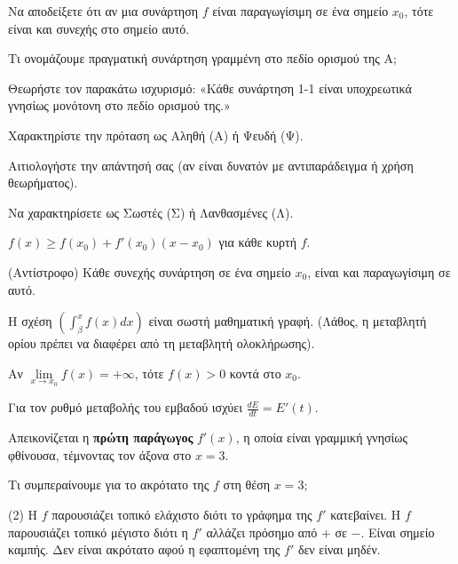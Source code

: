 \documentclass[11pt,a4paper]{article}
\newcommand{\kerkissans}[1]{{\fontfamily{maksf}\selectfont \textbf{#1}}}
\renewcommand{\textdexiakeraia}{}
\newcommand{\dint}{\displaystyle\int}
\newcommand\themanum{A}
\newcounter{thema}[section]
\renewcommand{\thethema}{\arabic{thema}}
\newcommand{\Thema}{\refstepcounter{thema}{\textbf{\textcolor{black}{\faPenSquare\ \  \large \kerkissans{\textbf{\thethemaο\hspace{2mm}Διαγώνισμα - Θέμα \themanum}}}}}\hspace{0mm}}{}
\newenvironment{thema}[1]
{\begin{tcolorbox}[title=\Thema\kerkissans{\textbf{\large{  #1}}},breakable,
enhanced standard,titlerule=0pt,toprule=0pt, rightrule=0pt, bottomrule=0pt,
colback=white,left=0mm,top=1mm,bottom=0mm,
boxrule=0pt,
colframe=white,leftrule=0mm,sharp corners,coltitle=black]
\renewcommand{\themanum}{#1}}
{\end{tcolorbox}}
\begin{document}
\vspace{1cm}

\begin{thema}{A}
\begin{erwthma}
    \item Να αποδείξετε ότι αν μια συνάρτηση $f$ είναι παραγωγίσιμη σε ένα σημείο $x_0$, τότε είναι και συνεχής στο σημείο αυτό.
    \item Τι ονομάζουμε πραγματική συνάρτηση γραμμένη στο πεδίο ορισμού της Α;
    \item Θεωρήστε τον παρακάτω ισχυρισμό:
    «Κάθε συνάρτηση 1-1 είναι υποχρεωτικά γνησίως μονότονη στο πεδίο ορισμού της.»
    \begin{alist}
    \item Χαρακτηρίστε την πρόταση ως Αληθή (Α) ή Ψευδή (Ψ).
    \item Αιτιολογήστε την απάντησή σας (αν είναι δυνατόν με αντιπαράδειγμα ή χρήση θεωρήματος).
    \end{alist}
    \item Να χαρακτηρίσετε ως Σωστές (Σ) ή Λανθασμένες (Λ).
    \begin{alist}
        \item $f(x) \ge f(x_0) + f'(x_0)(x-x_0)$ για κάθε κυρτή $f$.
        \item (Αντίστροφο) Κάθε συνεχής συνάρτηση σε ένα σημείο $x_0$, είναι και παραγωγίσιμη σε αυτό.
        \item Η σχέση $\left( \dint_\beta^x f(x) dx \right)$ είναι σωστή μαθηματική γραφή. (Λάθος, η μεταβλητή ορίου πρέπει να διαφέρει από τη μεταβλητή ολοκλήρωσης).
        \item Αν $\lim\limits_{x\to x_0} f(x) = +\infty$, τότε $f(x) > 0$ κοντά στο $x_0$.
        \item Για τον ρυθμό μεταβολής του εμβαδού ισχύει $\frac{dE}{dt} = E'(t)$.
    \end{alist}
    \item Απεικονίζεται η \textbf{πρώτη παράγωγος} $f'(x)$, η οποία είναι γραμμική γνησίως φθίνουσα, τέμνοντας τον άξονα στο $x=3$.
    \begin{center}
    \end{center}
    Τι συμπεραίνουμε για το ακρότατο της $f$ στη θέση $x=3$;
    \begin{tasks}[label=\let\textdexiakeraia\relax\alph*.](2)
        \task H $f$ παρουσιάζει τοπικό ελάχιστο διότι το γράφημα της $f'$ κατεβαίνει.
        \task H $f$ παρουσιάζει τοπικό μέγιστο διότι η $f'$ αλλάζει πρόσημο από $+$ σε $-$.
        \task Είναι σημείο καμπής.
        \task Δεν είναι ακρότατο αφού η εφαπτομένη της $f'$ δεν είναι μηδέν.
    \end{tasks}
\end{erwthma}
\end{thema}
\end{document}

